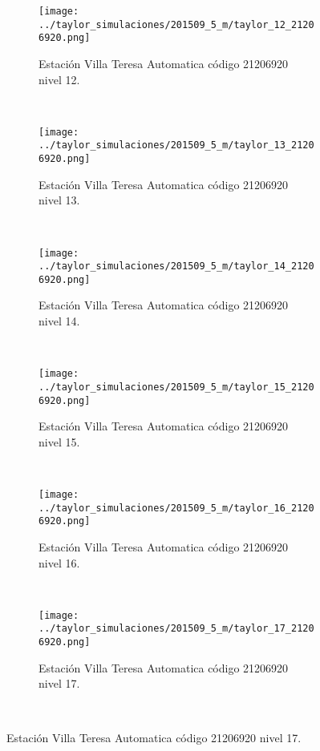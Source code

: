 \begin{figure}[H]\ContinuedFloat
\centering
\begin{subfigure}[normla]{0.4\textwidth}
\caption{Estación Villa Teresa Automatica  código 21206920 nivel 12.}
\texttt{[image: ../taylor\_simulaciones/201509\_5\_m/taylor\_12\_21206920.png]}
\end{subfigure}
~
\begin{subfigure}[normla]{0.4\textwidth}
\caption{Estación Villa Teresa Automatica  código 21206920 nivel 13.}
\texttt{[image: ../taylor\_simulaciones/201509\_5\_m/taylor\_13\_21206920.png]}
\end{subfigure}
~
\begin{subfigure}[normla]{0.4\textwidth}
\caption{Estación Villa Teresa Automatica  código 21206920 nivel 14.}
\texttt{[image: ../taylor\_simulaciones/201509\_5\_m/taylor\_14\_21206920.png]}
\end{subfigure}
~
\begin{subfigure}[normla]{0.4\textwidth}
\caption{Estación Villa Teresa Automatica  código 21206920 nivel 15.}
\texttt{[image: ../taylor\_simulaciones/201509\_5\_m/taylor\_15\_21206920.png]}
\end{subfigure}
~
\begin{subfigure}[normla]{0.4\textwidth}
\caption{Estación Villa Teresa Automatica  código 21206920 nivel 16.}
\texttt{[image: ../taylor\_simulaciones/201509\_5\_m/taylor\_16\_21206920.png]}
\end{subfigure}
~
\begin{subfigure}[normla]{0.4\textwidth}
\caption{Estación Villa Teresa Automatica  código 21206920 nivel 17.}
\texttt{[image: ../taylor\_simulaciones/201509\_5\_m/taylor\_17\_21206920.png]}
\end{subfigure}
~
\end{figure}
           
